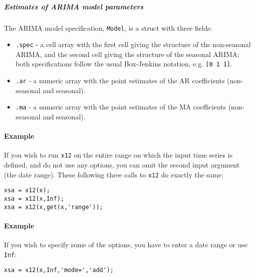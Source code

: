 \subparagraph{Estimates of ARIMA model
parameters}\label{estimates-of-arima-model-parameters}

The ARIMA model specification, \texttt{Model}, is a struct with three
fields:

\begin{itemize}
\item
  \texttt{.spec} - a cell array with the first cell giving the structure
  of the non-seasonal ARIMA, and the second cell giving the structure of
  the seasonal ARIMA; both specifications follow the usual Box-Jenkins
  notation, e.g. \texttt{{[}0 1 1{]}}.
\item
  \texttt{.ar} - a numeric array with the point estimates of the AR
  coefficients (non-seasonal and seasonal).
\item
  \texttt{.ma} - a numeric array with the point estimates of the MA
  coefficients (non-seasonal and seasonal).
\end{itemize}

\paragraph{Example}\label{example}

If you wish to run \texttt{x12} on the entire range on which the input
time series is defined, and do not use any options, you can omit the
second input argument (the date range). These following three calls to
\texttt{x12} do exactly the same:

\begin{verbatim}
xsa = x12(x);
xsa = x12(x,Inf);
xsa = x12(x,get(x,'range'));
\end{verbatim}

\paragraph{Example}\label{example-1}

If you wish to specify some of the options, you have to enter a date
range or use \texttt{Inf}:

\begin{verbatim}
xsa = x12(x,Inf,'mode=','add');
\end{verbatim}


